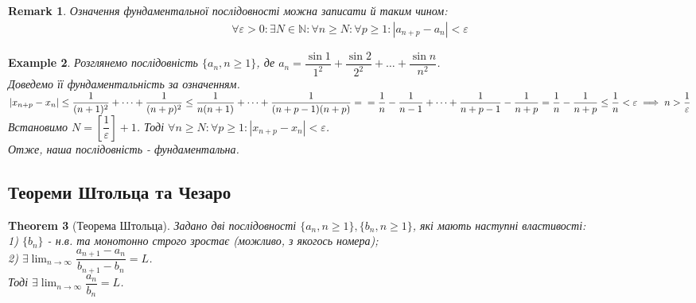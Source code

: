 \documentclass[a4paper, 14pt]{article}
\theoremstyle{theoremdd}
\newtheorem{theorem}{Theorem}[subsection]
\theoremstyle{theoremdd}
\theoremstyle{theoremdd}
\theoremstyle{theoremdd}
\newtheorem{example}[theorem]{Example}
\theoremstyle{theoremdd}
\theoremstyle{theoremdd}
\newtheorem{remark}[theorem]{Remark}
\theoremstyle{theoremdd}
\theoremstyle{theoremdd}
\begin{document}
	\begin{remark}
	Означення фундаментальної послідовності можна записати й таким чином:
	\begin{align*}
	\forall \varepsilon > 0: \exists N \in \mathbb{N}: \forall n \geq N: \forall p \geq 1: |a_{n+p} - a_n| < \varepsilon
	\end{align*}
	\end{remark}
	
	\begin{example}
	Розглянемо послідовність $\{a_n, n \geq 1\}$, де $a_n = \dfrac{\sin 1}{1^2} + \dfrac{\sin 2}{2^2} + \dots + \dfrac{\sin n}{n^2}$.\\
	Доведемо її фундаментальність за означенням.\\
	$|x_{n+p} - x_n| \leq \dfrac{1}{(n+1)^2} + \dots + \dfrac{1}{(n+p)^2} \leq \dfrac{1}{n(n+1)} + \dots + \dfrac{1}{(n+p-1)(n+p)} = \\ = \dfrac{1}{n} - \dfrac{1}{n-1} + \dots + \dfrac{1}{n+p-1} - \dfrac{1}{n+p} = \dfrac{1}{n} - \dfrac{1}{n+p} \leq \dfrac{1}{n} < \varepsilon \implies n > \dfrac{1}{\varepsilon}$\\
	Встановимо $N = \left[ \dfrac{1}{\varepsilon} \right] + 1$. Тоді $\forall n \geq N: \forall p \geq 1: |x_{n+p} - x_n| < \varepsilon$.\\
	Отже, наша послідовність - фундаментальна.
	\end{example}
	
	\subsection{Теореми Штольца та Чезаро}
	\begin{theorem}[Теорема Штольца]
	Задано дві послідовності $\{a_n, n \geq 1\}, \{b_n, n \geq 1\}$, які мають наступні властивості:\\
	1) $\{b_n\}$ - н.в. та монотонно строго зростає (можливо, з якогось номера);\\
	2) $\exists \displaystyle \lim_{n \to \infty} \dfrac{a_{n+1} - a_n}{b_{n+1} - b_n} = L$.\\
	Тоді $\exists \displaystyle \lim_{n \to \infty} \dfrac{a_n}{b_n} = L$.
	\end{theorem}
	
\end{document}
